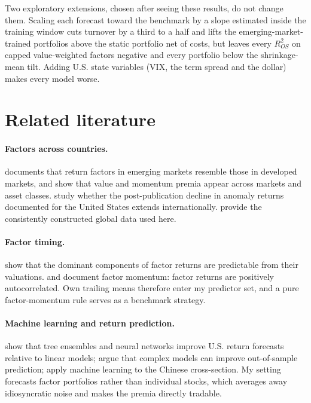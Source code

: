 \documentclass[11pt]{article}
\begin{document}
Two exploratory extensions, chosen after seeing these results, do not change them. Scaling each forecast toward the benchmark by a slope estimated inside the training window cuts turnover by a third to a half and lifts the emerging-market-trained portfolios above the static portfolio net of costs, but leaves every $R^2_{OS}$ on capped value-weighted factors negative and every portfolio below the shrinkage-mean tilt. Adding U.S. state variables (VIX, the term spread and the dollar) makes every model worse.

\section{Related literature}

\paragraph{Factors across countries.} \citet{rouwenhorst1999local} documents that return factors in emerging markets resemble those in developed markets, and \citet{asness2013value} show that value and momentum premia appear across markets and asset classes. \citet{jacobs2020anomalies} study whether the post-publication decline in anomaly returns documented for the United States extends internationally. \citet{jensen2023replication} provide the consistently constructed global data used here.

\paragraph{Factor timing.} \citet{haddad2020factor} show that the dominant components of factor returns are predictable from their valuations. \citet{gupta2019factor} and \citet{ehsani2022factor} document factor momentum: factor returns are positively autocorrelated. Own trailing means therefore enter my predictor set, and a pure factor-momentum rule serves as a benchmark strategy.

\paragraph{Machine learning and return prediction.} \citet{gu2020empirical} show that tree ensembles and neural networks improve U.S. return forecasts relative to linear models; \citet{kelly2024virtue} argue that complex models can improve out-of-sample prediction; \citet{leippold2022machine} apply machine learning to the Chinese cross-section. My setting forecasts factor portfolios rather than individual stocks, which averages away idiosyncratic noise and makes the premia directly tradable.
\end{document}
